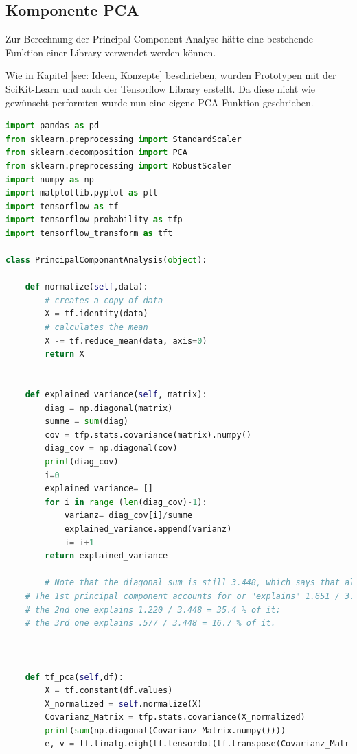 \subsection{Komponente PCA}
Zur Berechnung der Principal Component Analyse hätte eine bestehende Funktion einer Library verwendet werden können.

Wie in Kapitel \ref{sec: Ideen, Konzepte} beschrieben, wurden Prototypen mit der SciKit-Learn und auch der Tensorflow Library erstellt. Da diese nicht wie gewünscht performten wurde nun eine eigene PCA Funktion geschrieben.

\begin{lstlisting}[language=Python, caption= Komponente PCA, label=lst:PCA Komponente]
import pandas as pd
from sklearn.preprocessing import StandardScaler
from sklearn.decomposition import PCA
from sklearn.preprocessing import RobustScaler
import numpy as np
import matplotlib.pyplot as plt
import tensorflow as tf
import tensorflow_probability as tfp
import tensorflow_transform as tft

class PrincipalComponantAnalysis(object):
    
    def normalize(self,data):
        # creates a copy of data
        X = tf.identity(data)
        # calculates the mean
        X -= tf.reduce_mean(data, axis=0)
        return X


    def explained_variance(self, matrix):
        diag = np.diagonal(matrix)
        summe = sum(diag)
        cov = tfp.stats.covariance(matrix).numpy()
        diag_cov = np.diagonal(cov)
        print(diag_cov)
        i=0
        explained_variance= []
        for i in range (len(diag_cov)-1):
            varianz= diag_cov[i]/summe
            explained_variance.append(varianz)
            i= i+1
        return explained_variance

        # Note that the diagonal sum is still 3.448, which says that all 3 components account for all the multivariate variability.
    # The 1st principal component accounts for or "explains" 1.651 / 3.448 = 47.9 % of the overall variability;
    # the 2nd one explains 1.220 / 3.448 = 35.4 % of it;
    # the 3rd one explains .577 / 3.448 = 16.7 % of it.



    def tf_pca(self,df):
        X = tf.constant(df.values)
        X_normalized = self.normalize(X)
        Covarianz_Matrix = tfp.stats.covariance(X_normalized)
        print(sum(np.diagonal(Covarianz_Matrix.numpy())))
        e, v = tf.linalg.eigh(tf.tensordot(tf.transpose(Covarianz_Matrix), Covarianz_Matrix, axes=1))


\end{lstlisting}
